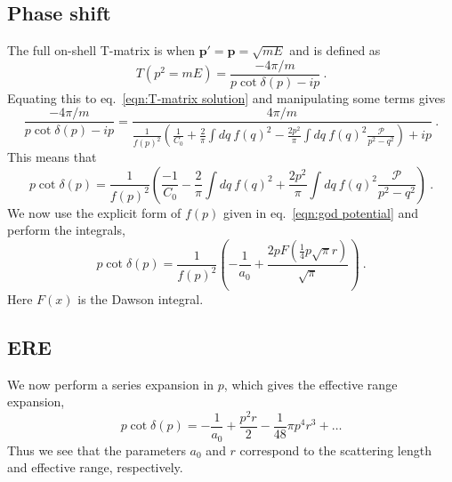 \documentclass[11pt]{article}
\begin{document}
\subsection{Phase shift\label{sect:phase shift}}
The full on-shell T-matrix is when $\bm p'=\bm p=\sqrt{mE}$ and is defined as
\begin{equation}
T(p^2=mE)=\frac{-4\pi/m}{p\cot \delta(p)-ip}\ .
\end{equation}
Equating this to eq.~\eqref{eqn:T-matrix solution} and manipulating some terms gives
\begin{equation}
\frac{-4\pi/m}{p\cot \delta(p)-ip}=
\frac{4\pi/m}{\frac{1}{f(p)^2}\left(\frac{1}{C_0}+\frac{2}{\pi}\int dq\  f(q)^2-\frac{2p^2}{\pi}\int dq\ f(q)^2\frac{\mathcal{P}}{p^2-q^2}\right)+ip}\ .
\end{equation}
This means that
\begin{equation}
p\cot\delta(p)=\frac{1}{f(p)^2}\left(\frac{-1}{C_0}-\frac{2}{\pi}\int dq\  f(q)^2+\frac{2p^2}{\pi}\int dq\ f(q)^2\frac{\mathcal{P}}{p^2-q^2}\right)\ .
\end{equation}
We now use the explicit form of $f(p)$ given in eq.~\eqref{eqn:god potential} and perform the integrals,
\begin{equation}
\boxed{
p\cot\delta(p)=\frac{1}{f(p)^2}\left(-\frac{1}{a_0}+\frac{2 p F\left(\frac{1}{4} p \sqrt{\pi } r\right)}{\sqrt{\pi
   }}\right)}\ .
\end{equation}
Here $F(x)$ is the Dawson integral.

\subsection{ERE\label{sect:ERE}}
We now perform a series expansion in $p$, which gives the effective range expansion,
\begin{equation}
p\cot\delta(p)=-\frac{1}{a_0}+\frac{p^2 r}{2}-\frac{1}{48} \pi  p^4 r^3+\ldots
\end{equation}
Thus we see that the parameters $a_0$ and $r$ correspond to the scattering length and effective range, respectively.
\end{document}

